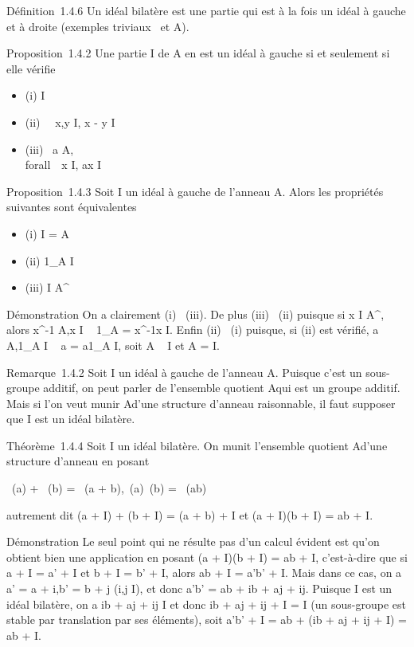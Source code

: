 Définition~1.4.6 Un idéal bilatère est une partie qui est à la fois un
idéal à gauche et à droite (exemples triviaux
\0\ et A).

Proposition~1.4.2 Une partie I de A en est un idéal à gauche si et
seulement si elle vérifie

\begin{itemize}
\itemsep1pt\parskip0pt
\item
  (i) I\neq~\varnothing~
\item
  (ii) \forall~~x,y \in I, x - y \in I
\item
  (iii) \forall~a \in A,\\forall~~x \in
  I, ax \in I
\end{itemize}

Proposition~1.4.3 Soit I un idéal à gauche de l'anneau A. Alors les
propriétés suivantes sont équivalentes

\begin{itemize}
\itemsep1pt\parskip0pt
\item
  (i) I = A
\item
  (ii) 1_A \in I
\item
  (iii) I \bigcap A^\times\neq~\varnothing~
\end{itemize}

Démonstration On a clairement (i) \rigtharrow~(iii). De plus (iii) \rigtharrow~(ii) puisque si
x \in I \bigcap A^\times, alors x^-1 \in A,x \in I \rigtharrow~ 1_A =
x^-1x \in I. Enfin (ii) \rigtharrow~(i) puisque, si (ii) est vérifié, a \in
A,1_A \in I \rigtharrow~ a = a1_A \in I, soit A \subset~ I et A = I.

Remarque~1.4.2 Soit I un idéal à gauche de l'anneau A. Puisque c'est un
sous-groupe additif, on peut parler de l'ensemble quotient A\diagupI qui est
un groupe additif. Mais si l'on veut munir A\diagupI d'une structure d'anneau
raisonnable, il faut supposer que I est un idéal bilatère.

Théorème~1.4.4 Soit I un idéal bilatère. On munit l'ensemble quotient
A\diagupI d'une structure d'anneau en posant

\pi~(a) + \pi~(b) = \pi~(a + b),\quad \pi~(a)\pi~(b) = \pi~(ab)

autrement dit (a + I) + (b + I) = (a + b) + I et (a + I)(b + I) = ab +
I.

Démonstration Le seul point qui ne résulte pas d'un calcul évident est
qu'on obtient bien une application en posant (a + I)(b + I) = ab + I,
c'est-à-dire que si a + I = a' + I et b + I = b' + I, alors ab + I =
a'b' + I. Mais dans ce cas, on a a' = a + i,b' = b + j (i,j \in I), et
donc a'b' = ab + ib + aj + ij. Puisque I est un idéal bilatère, on a ib
+ aj + ij \in I et donc ib + aj + ij + I = I (un sous-groupe est stable
par translation par ses éléments), soit a'b' + I = ab + (ib + aj + ij +
I) = ab + I.

